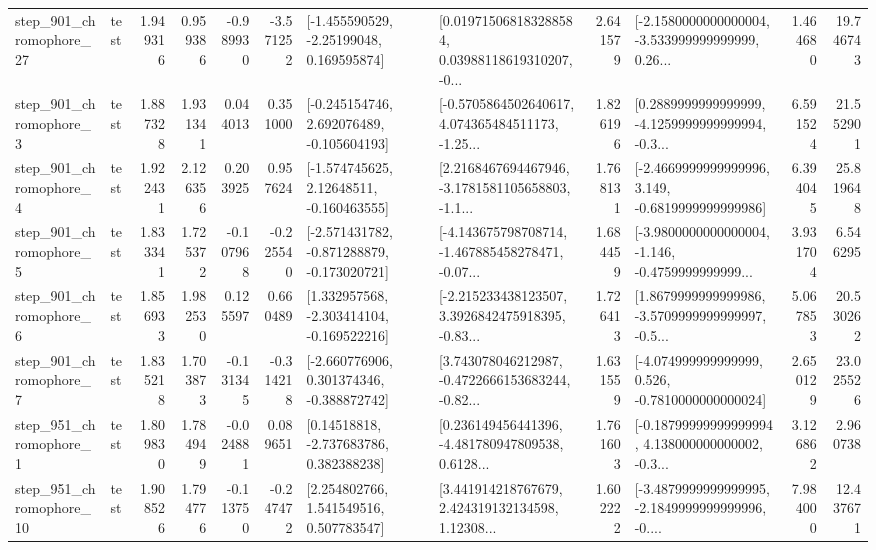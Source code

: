 \begin{tabular}{llrrrrllrlrr}
  step\_901\_chromophore\_27 &      test &      1.949316 &    0.959386 &     -0.989930 & -3.571252 &    [-1.455590529, -2.25199048, 0.169595874] &  [0.019715068183288584, 0.03988118619310207, -0... &       2.641579 &  [-2.1580000000000004, -3.533999999999999, 0.26... &            1.464680 &         19.746743 \\
   step\_901\_chromophore\_3 &      test &      1.887328 &    1.931341 &      0.044013 &  0.351000 &   [-0.245154746, 2.692076489, -0.105604193] &  [-0.5705864502640617, 4.074365484511173, -1.25... &       1.826196 &  [0.2889999999999999, -4.1259999999999994, -0.3... &            6.591524 &         21.552901 \\
   step\_901\_chromophore\_4 &      test &      1.922431 &    2.126356 &      0.203925 &  0.957624 &    [-1.574745625, 2.12648511, -0.160463555] &  [2.2168467694467946, -3.1781581105658803, -1.1... &       1.768131 &  [-2.4669999999999996, 3.149, -0.6819999999999986] &            6.394045 &         25.819648 \\
   step\_901\_chromophore\_5 &      test &      1.833341 &    1.725372 &     -0.107968 & -0.225540 &  [-2.571431782, -0.871288879, -0.173020721] &  [-4.143675798708714, -1.467885458278471, -0.07... &       1.684459 &  [-3.9800000000000004, -1.146, -0.4759999999999... &            3.931704 &          6.546295 \\
   step\_901\_chromophore\_6 &      test &      1.856933 &    1.982530 &      0.125597 &  0.660489 &   [1.332957568, -2.303414104, -0.169522216] &  [-2.215233438123507, 3.3926842475918395, -0.83... &       1.726413 &  [1.8679999999999986, -3.5709999999999997, -0.5... &            5.067853 &         20.530262 \\
   step\_901\_chromophore\_7 &      test &      1.835218 &    1.703873 &     -0.131345 & -0.314218 &   [-2.660776906, 0.301374346, -0.388872742] &  [3.743078046212987, -0.4722666153683244, -0.82... &       1.631559 &   [-4.074999999999999, 0.526, -0.7810000000000024] &            2.650129 &         23.025526 \\
   step\_951\_chromophore\_1 &      test &      1.809830 &    1.784949 &     -0.024881 &  0.089651 &     [0.14518818, -2.737683786, 0.382388238] &  [0.236149456441396, -4.481780947809538, 0.6128... &       1.761603 &  [-0.18799999999999994, 4.138000000000002, -0.3... &            3.126862 &          2.960738 \\
  step\_951\_chromophore\_10 &      test &      1.908526 &    1.794776 &     -0.113750 & -0.247472 &     [2.254802766, 1.541549516, 0.507783547] &  [3.441914218767679, 2.424319132134598, 1.12308... &       1.602222 &  [-3.4879999999999995, -2.1849999999999996, -0.... &            7.984000 &         12.437671 \\

\end{tabular}
